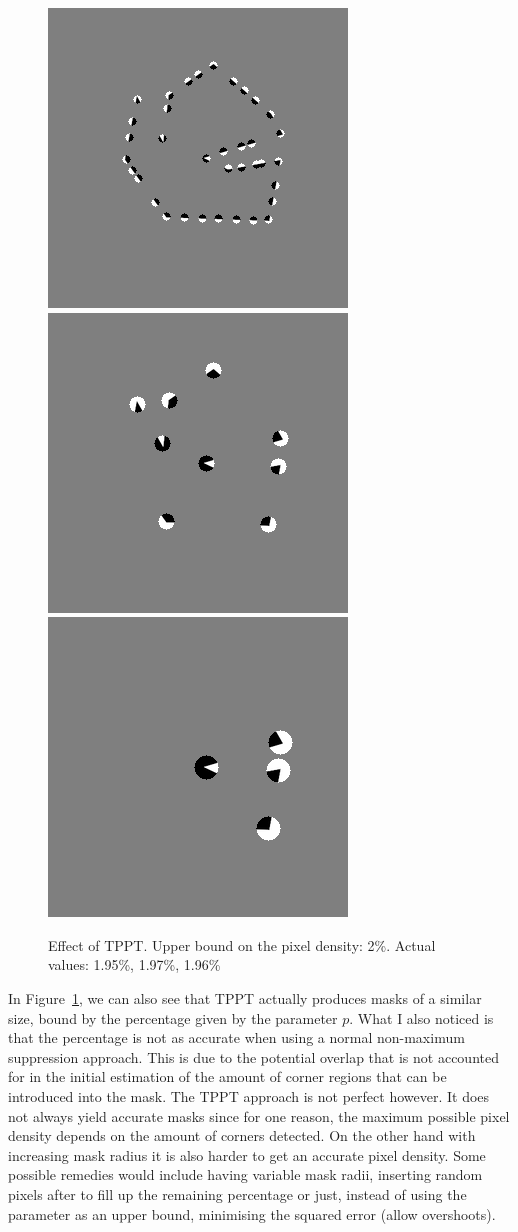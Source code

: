 \begin{figure}[ht]
    \centering
    \includegraphics[width=0.3\linewidth]{../Images/tppt_ex/abstract1_small4.png}
    \includegraphics[width=0.3\linewidth]{../Images/tppt_ex/abstract1_small8.png}
    \includegraphics[width=0.3\linewidth]{../Images/tppt_ex/abstract1_small12.png}
    \caption{Effect of TPPT. Upper bound on the pixel density: 2\%. Actual values:
    1.95\%, 1.97\%, 1.96\%}
    \label{fig:TPPTEx}
\end{figure}
In Figure~\ref{fig:TPPTEx}, we can also see that TPPT actually produces masks of a
similar size, bound by the percentage given by the parameter $p$. What I also noticed is that the
percentage is not as accurate when using a normal non-maximum suppression approach. This is due to
the potential overlap that is not accounted for in the initial estimation of the amount of corner
regions that can be introduced into the mask.
The TPPT approach is not perfect however. It does not always yield accurate masks since for one
reason, the maximum possible pixel density depends on the amount of corners detected. On the other
hand with increasing mask radius it is also harder to get an accurate pixel density. Some possible
remedies would include having variable mask radii, inserting random pixels after to fill up the
remaining percentage or just, instead of using the parameter as an upper bound, minimising the
squared error (allow overshoots).

